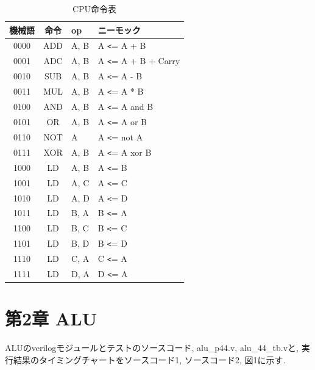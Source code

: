 \documentclass[12pt]{jreport}
\begin{document}
            \begin{table}[htb]
              \begin{center}
                \caption{CPU命令表}
                \begin{tabular} {|c|c|l||l|} \hline
                  機械語 & 命令 & op & ニーモック \\ \hline \hline
                  0000 & ADD & A, B & A \verb|<|= A + B \\ \hline
                  0001 & ADC & A, B & A \verb|<|= A + B + Carry \\ \hline
                  0010 & SUB & A, B & A \verb|<|= A - B \\ \hline
                  0011 & MUL & A, B & A \verb|<|= A * B \\ \hline

                  0100 & AND & A, B & A \verb|<|= A and B \\ \hline
                  0101 & OR & A, B & A \verb|<|= A or B \\ \hline
                  0110 & NOT & A & A \verb|<|= not A \\ \hline
                  0111 & XOR & A, B & A \verb|<|= A xor B \\ \hline

                  1000 & LD & A, B & A \verb|<|= B \\ \hline
                  1001 & LD & A, C & A \verb|<|= C \\ \hline
                  1010 & LD & A, D & A \verb|<|= D \\ \hline
                  1011 & LD & B, A & B \verb|<|= A \\ \hline

                  1100 & LD & B, C & B \verb|<|= C \\ \hline
                  1101 & LD & B, D & B \verb|<|= D \\ \hline
                  1110 & LD & C, A & C \verb|<|= A \\ \hline
                  1111 & LD & D, A & D \verb|<|= A \\ \hline
                \end{tabular}
              \end{center}
            \end{table}

    \chapter*{第2章 ALU}
        ALUのverilogモジュールとテストのソースコード, alu\_p44.v, alu\_44\_tb.vと, 実行結果のタイミングチャートをソースコード1, ソースコード2, 図1に示す. 
\end{document}
